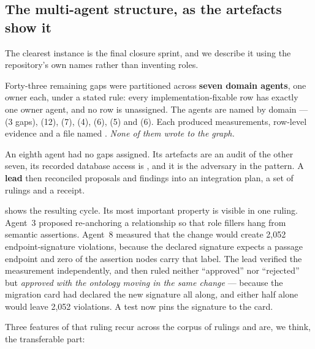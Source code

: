 \subsection{The multi-agent structure, as the artefacts show it}
\label{sec:multiagent}

The clearest instance is the final closure sprint, and we describe it using the
repository's own names rather than inventing roles.

Forty-three remaining gaps were partitioned across \textbf{seven domain agents}, one
owner each, under a stated rule: every implementation-fixable row has exactly one
owner agent, and no row is unassigned. The agents are named by domain ---
 (3 gaps),
 (12),
 (7),  (4),
 (6),  (5) and
 (6). Each produced measurements, row-level
evidence and a file named . \emph{None of them wrote
to the graph.}

An eighth agent had no gaps assigned. Its artefacts are an audit of the other seven,
its recorded database access is , and it is the adversary in the
pattern. A \textbf{lead} then reconciled proposals and findings into an integration
plan, a set of rulings and a receipt.

 shows the resulting cycle. Its most important property is
visible in one ruling. Agent~3 proposed re-anchoring a relationship so that role
fillers hang from semantic assertions. Agent~8 measured that the change would create
2{,}052 endpoint-signature violations, because the declared signature expects a
passage endpoint and zero of the assertion nodes carry that label. The lead verified
the measurement independently, and then ruled neither ``approved'' nor ``rejected''
but \emph{approved with the ontology moving in the same change} --- because the
migration card had declared the new signature all along, and either half alone would
leave 2{,}052 violations. A test now pins the signature to the card.

Three features of that ruling recur across the corpus of rulings and are, we think,
the transferable part:

